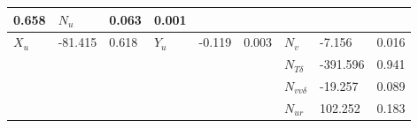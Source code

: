 \begin{table}[h]
\begin{tabular}{|T|T|T|T|T|T|T|T|T|}
0.658
&

\( N_{u} \)
&

0.063
&

0.001
\\
\hline

\( X_{u} \)
&

-81.415
&

0.618
&

\( Y_{u} \)
&

-0.119
&

0.003
&

\( N_{v} \)
&

-7.156
&

0.016
\\
\hline&&&&&&

\( N_{T\delta} \)
&

-391.596
&

0.941
\\
\hline&&&&&&

\( N_{vv\delta} \)
&

-19.257
&

0.089
\\
\hline&&&&&&

\( N_{ur} \)
&

102.252
&

0.183
\\
\hline
\end{tabular}

\end{table}

